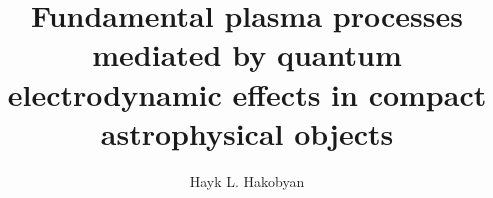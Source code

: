 \title{Fundamental plasma processes mediated by quantum electrodynamic effects in compact astrophysical objects}
\author{Hayk L. Hakobyan}


